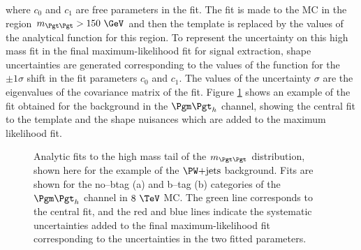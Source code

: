where $c_{0}$ and $c_{1}$ are free parameters in the fit. The fit is made to
the \ac{MC} in the region $m_{\Pgt\Pgt} > 150~\GeV$ and then the template is
replaced by the values of the analytical function for this region. To represent
the uncertainty on this high mass fit in the final maximum-likelihood fit for
signal extraction, shape uncertainties are generated corresponding to the 
values of the function for the $\pm1\sigma$ shift in the fit parameters $c_{0}$ 
and $c_{1}$. The values of the uncertainty $\sigma$ are the 
eigenvalues of the covariance matrix of the fit. Figure \ref{fig:tailfits} shows
an example of the fit obtained for the \WJets background in the $\mutau$
channel, showing the central fit to the template and the shape nuisances which
are added to the maximum likelihood fit.

\begin{figure}[tbh]
\caption{Analytic fits to the high mass tail of the $m_{\Pgt\Pgt}$ distribution,
shown here for the example of the $\WJets$ background. Fits are shown for the
no--btag (a) and b--tag (b) categories of the $\mutau$ channel in $8~\TeV$
\ac{MC}. The green line corresponds to the central fit, and the red and blue
lines indicate the systematic uncertainties added to the final
maximum-likelihood fit corresponding to the uncertainties in the two fitted
parameters.}
\label{fig:tailfits}
\end{figure}

